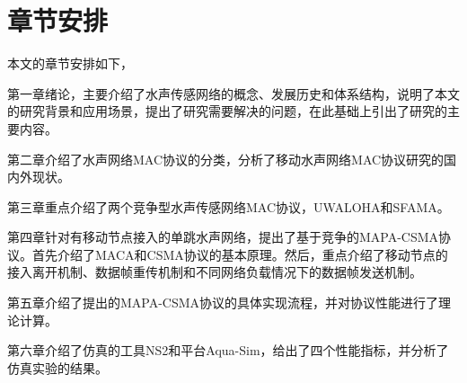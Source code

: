 \section{章节安排}
本文的章节安排如下，

第一章绪论，主要介绍了水声传感网络的概念、发展历史和体系结构，说明了本文的研究背景和应用场景，提出了研究需要解决的问题，在此基础上引出了研究的主要内容。

第二章介绍了水声网络MAC协议的分类，分析了移动水声网络MAC协议研究的国内外现状。

第三章重点介绍了两个竞争型水声传感网络MAC协议，UWALOHA和SFAMA。

第四章针对有移动节点接入的单跳水声网络，提出了基于竞争的MAPA-CSMA协议。首先介绍了MACA和CSMA协议的基本原理。然后，重点介绍了移动节点的接入离开机制、数据帧重传机制和不同网络负载情况下的数据帧发送机制。

第五章介绍了提出的MAPA-CSMA协议的具体实现流程，并对协议性能进行了理论计算。

第六章介绍了仿真的工具NS2和平台Aqua-Sim，给出了四个性能指标，并分析了仿真实验的结果。

\endinput